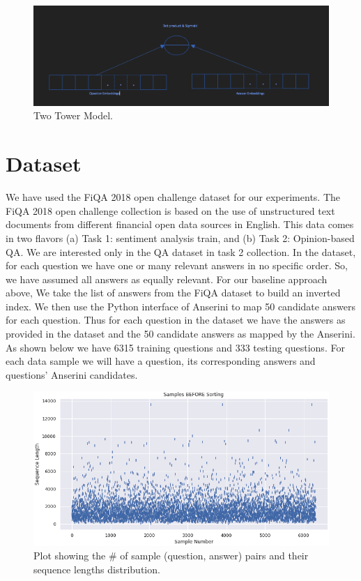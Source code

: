 \documentclass[11pt,a4paper]{article}
\begin{document}
\begin{figure}
  \includegraphics[width=\linewidth]{two-tower.png}
  \caption{Two Tower Model.}
  \label{fig:two-tower model}
\end{figure}


\section{Dataset}
We have used the FiQA 2018 open challenge dataset for our experiments. The FiQA 2018 open challenge collection is based on the use of unstructured text documents from different financial open data sources in English. This data comes in two flavors (a) Task 1: sentiment analysis train, and (b) Task 2: Opinion-based QA. We are interested only in the QA dataset in task 2 collection. In the dataset, for each question we have one or many relevant answers in no specific order. So, we have assumed all answers as equally relevant. For our baseline approach above, We take the list of answers from the FiQA dataset to build an inverted index. We then use the Python interface of Anserini to map 50 candidate answers for each question. Thus for each question in the dataset we have the answers as provided in the dataset and the 50 candidate answers as mapped by the Anserini. As shown below we have 6315 training questions and 333 testing questions. For each data sample we will have a question, its corresponding answers and questions' Anserini candidates.

\begin{figure}
  \includegraphics[width=\linewidth]{doc_size_distribution.png}
  \caption{Plot showing the # of sample (question, answer) pairs and their sequence lengths distribution.}
  \label{fig:Sequence Length Distribution}
\end{figure}
\end{document}
